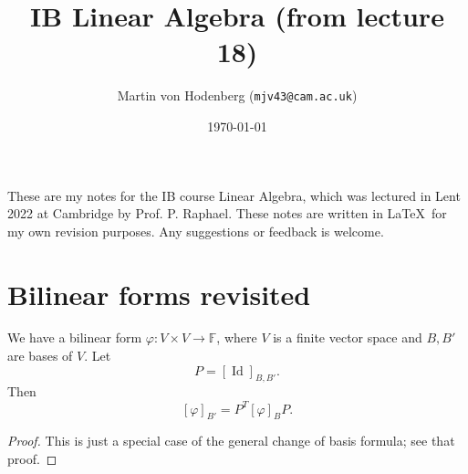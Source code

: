 \documentclass[a4paper]{scrartcl}
\title{IB Linear Algebra (from lecture 18)}
\author{Martin von Hodenberg (\texttt{mjv43@cam.ac.uk})}
\date{\today}
\begin{document}
\maketitle

These are my notes for the IB course Linear Algebra, which was lectured in Lent 2022 at Cambridge by Prof. P. Raphael. These notes are written in \LaTeX \ for my own revision purposes. Any suggestions or feedback is welcome.


\tableofcontents
\newpage 

\section{Bilinear forms revisited}
\begin{lemma}
    We have a bilinear form $\varphi: V \times V \rightarrow \mathbb{F}$, where $V$ is a finite vector space and $B, B'$ are bases of $V$. Let 
    \[P=[\operatorname{Id}]_{B,B'}.\]
     Then 
    \[[\varphi]_{B'}=P^T [\varphi]_B P.\]
\end{lemma}
\begin{proof}
     This is just a special case of the general change of basis formula; see that proof.
\end{proof}
\end{document}
